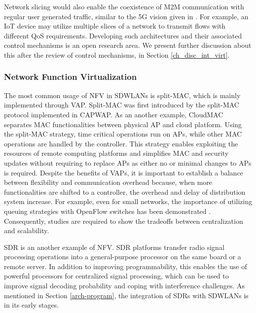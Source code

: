 Network slicing would also enable the coexistence of M2M communication with regular user generated traffic, similar to the 5G vision given in \cite{alliance20155g}.
For example, an IoT device may utilize multiple slices of a network to transmit flows with different QoS requirements.
Developing such architectures and their associated control mechanisms is an open research area.
We present further discussion about this after the review of control mechanisms, in Section \ref{ch_disc_int_virt}.






\subsubsection{\textbf{Network Function Virtualization}}
\label{nfv_dis}
The most common usage of NFV in SDWLANs is split-MAC, which is mainly implemented through VAP.
Split-MAC was first introduced by the split-MAC protocol implemented in CAPWAP. 
As an another example, CloudMAC separates MAC functionalities between physical AP and cloud platform.
Using the split-MAC strategy, time critical operations run on APs, while other MAC operations are handled by the controller. 
This strategy enables exploiting the resources of remote computing platforms and simplifies MAC and security updates without requiring to replace APs as either no or minimal changes to APs is required.
Despite the benefits of VAPs, it is important to establish a balance between flexibility and communication overhead because, when more functionalities are shifted to a controller, the overhead and delay of distribution system increase.
For example, even for small networks, the importance of utilizing queuing strategies with OpenFlow switches has been demonstrated \cite{CloudMAC3,Vestin2015b,Ethanol}.
Consequently, studies are required to show the tradeoffs between centralization and scalability.

SDR is an another example of NFV.
SDR platforms transfer radio signal processing operations into a general-purpose processor on the same board or a remote server.
In addition to improving programmability, this enables the use of powerful processors for centralized signal processing, which can be used to improve signal decoding probability and coping with interference challenges.
As mentioned in Section \ref{arch-program}, the integration of SDRs with SDWLANs is in its early stages.



